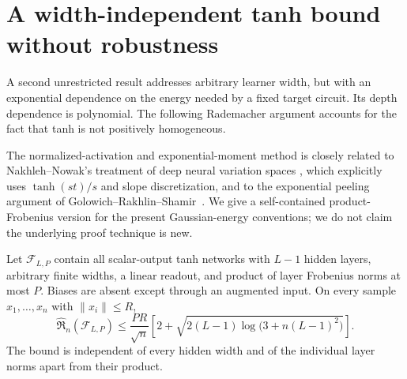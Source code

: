 \section{A width-independent tanh bound without robustness}
\label{sec:productnorm}

A second unrestricted result addresses arbitrary learner width, but with an
exponential dependence on the energy needed by a fixed target circuit.
Its depth dependence is polynomial. The following Rademacher argument
accounts for the fact that tanh is not positively homogeneous.

The normalized-activation and exponential-moment method is closely related
to Nakhleh--Nowak's treatment of deep neural variation spaces
\cite{nakhleh2026}, which explicitly uses $\tanh(st)/s$ and slope
discretization, and to the exponential peeling argument of
Golowich--Rakhlin--Shamir~\cite{golowich2018}. We give a self-contained
product-Frobenius version for the present Gaussian-energy conventions;
we do not claim the underlying proof technique is new.

\begin{theorem}\label{thm:tanh-product}
Let $\mathcal F_{L,P}$ contain all scalar-output tanh networks with $L-1$
hidden layers, arbitrary finite widths, a linear readout, and product of
layer Frobenius norms at most $P$. Biases are absent except through an
augmented input. On every sample $x_1,\ldots,x_n$ with $\|x_i\|\le R$,
\[
 \widehat{\mathfrak R}_n(\mathcal F_{L,P})
 \le \frac{PR}{\sqrt n}
 \left[2+\sqrt{2(L-1)\log\bigl(3+n(L-1)^2\bigr)}\right].
\]
The bound is independent of every hidden width and of the individual layer
norms apart from their product.
\end{theorem}

